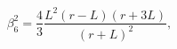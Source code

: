 \begin{equation}
\beta_6^{2}=\frac{4}{3}\frac{L^2(r-L)(r+3L)}{(r+L)^2},
\label{beta11}
\end{equation}

